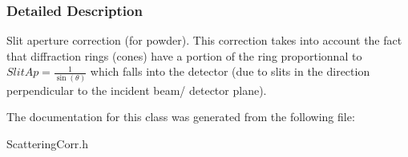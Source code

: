 \subsubsection{Detailed Description}
Slit aperture correction (for powder). This correction takes into account the fact that diffraction rings (cones) have a portion of the ring proportionnal to $ SlitAp = \frac{1}{\sin(\theta)} $ which falls into the detector (due to slits in the direction perpendicular to the incident beam/ detector plane). 

The documentation for this class was generated from the following file:\begin{DoxyCompactItemize}
\item 
ScatteringCorr.h\end{DoxyCompactItemize}
